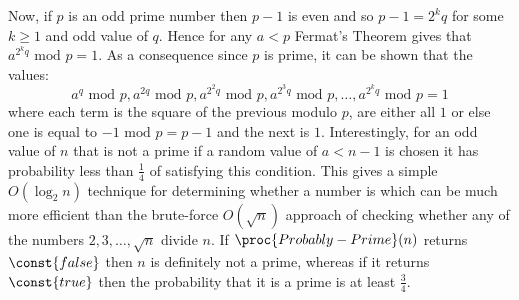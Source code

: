 Now, if $p$ is an odd prime number then $p-1$ is even and so
$p-1=2^k q$ for some $k\geq1$ and odd value of $q$.
Hence for any $a<p$ Fermat's Theorem gives that $a^{2^k q}\mbox{ mod }p=1$.
As a consequence since $p$ is prime, it can be shown that the values:
\begin{displaymath}
  a^q\mbox{ mod }p, a^{2q}\mbox{ mod }p, a^{2^2 q}\mbox{ mod }p,
  a^{2^3 q}\mbox{ mod }p, \dots, a^{2^k q}\mbox{ mod }p=1
\end{displaymath}
where each term is the square of the previous modulo $p$,
are either all $1$ or else one is equal to $-1\mbox{ mod }p=p-1$ and the next is $1$.
Interestingly, for an odd value of $n$ that is not a prime
if a random value of $a<n-1$ is chosen it has probability less than
$\frac{1}{4}$ of satisfying this condition.
This gives a simple $O(\log_2 n)$ technique for determining whether a number is
 which can be much more efficient than the brute-force $O(\sqrt{n})$
approach of checking whether any of the numbers
$2, 3, \dots, \sqrt{n}$ divide $n$.
If $\proc{Probably-Prime}(n)$ returns $\const{false}$ then $n$ is definitely
not a prime, whereas if it returns $\const{true}$ then the probability
that it is a prime is at least $\frac{3}{4}$.

